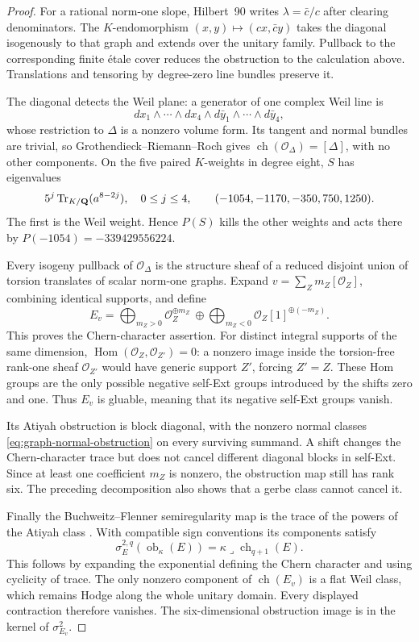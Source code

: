 \begin{proof}
For a rational norm-one slope, Hilbert~90 writes $\lambda=\bar c/c$ after clearing denominators. The $K$-endomorphism $(x,y)\mapsto(cx,\bar c y)$ takes the diagonal isogenously to that graph and extends over the unitary family. Pullback to the corresponding finite \'etale cover reduces the obstruction to the calculation above. Translations and tensoring by degree-zero line bundles preserve it.

The diagonal detects the Weil plane: a generator of one complex Weil line is
\[
 dx_1\wedge\cdots\wedge dx_4
 \wedge d\bar y_1\wedge\cdots\wedge d\bar y_4,
\]
whose restriction to $\Delta$ is a nonzero volume form. Its tangent and normal bundles are trivial, so Grothendieck--Riemann--Roch gives $\operatorname{ch}(\mathcal O_\Delta)=[\Delta]$, with no other components. On the five paired $K$-weights in degree eight, $S$ has eigenvalues
\[
 5^j\operatorname{Tr}_{K/\mathbf Q}(a^{8-2j}),\quad0\le j\le4,
 \qquad (-1054,-1170,-350,750,1250).
\]
The first is the Weil weight. Hence $P(S)$ kills the other weights and acts there by
$P(-1054)=-339429556224$.

Every isogeny pullback of $\mathcal O_\Delta$ is the structure sheaf of a reduced disjoint union of torsion translates of scalar norm-one graphs. Expand $v=\sum_Zm_Z[\mathcal O_Z]$, combining identical supports, and define
\[
 E_v=\bigoplus_{m_Z>0}\mathcal O_Z^{\oplus m_Z}
 \ \oplus\!
 \bigoplus_{m_Z<0}\mathcal O_Z[1]^{\oplus(-m_Z)}.
\]
This proves the Chern-character assertion. For distinct integral supports of the same dimension, $\operatorname{Hom}(\mathcal O_Z,\mathcal O_{Z'})=0$: a nonzero image inside the torsion-free rank-one sheaf $\mathcal O_{Z'}$ would have generic support $Z'$, forcing $Z'=Z$. These Hom groups are the only possible negative self-Ext groups introduced by the shifts zero and one. Thus $E_v$ is gluable, meaning that its negative self-Ext groups vanish.

Its Atiyah obstruction is block diagonal, with the nonzero normal classes \eqref{eq:graph-normal-obstruction} on every surviving summand. A shift changes the Chern-character trace but does not cancel different diagonal blocks in self-Ext. Since at least one coefficient $m_Z$ is nonzero, the obstruction map still has rank six. The preceding decomposition also shows that a gerbe class cannot cancel it.

Finally the Buchweitz--Flenner semiregularity map is the trace of the powers of the Atiyah class \cite[pp.~136--137]{BF}. With compatible sign conventions its components satisfy
\[
 \sigma_E^{2,q}(\operatorname{ob}_{\kappa}(E))
 =\kappa\mathbin{\lrcorner}\operatorname{ch}_{q+1}(E).
\]
This follows by expanding the exponential defining the Chern character and using cyclicity of trace. The only nonzero component of $\operatorname{ch}(E_v)$ is a flat Weil class, which remains Hodge along the whole unitary domain. Every displayed contraction therefore vanishes. The six-dimensional obstruction image is in the kernel of $\sigma_{E_v}^2$.


\end{proof}
